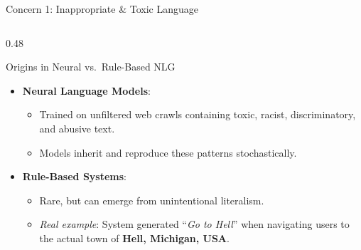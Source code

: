 \documentclass[aspectratio=169, 10pt]{beamer}
\begin{document}
\begin{frame}{Concern 1: Inappropriate \& Toxic Language}
  \begin{columns}[T]
    \begin{column}{0.48\textwidth}
      \begin{block}{Origins in Neural vs.\ Rule-Based NLG}
        \begin{itemize}
          \item \textbf{Neural Language Models}:
          \begin{itemize}
            \item Trained on unfiltered web crawls containing toxic, racist, discriminatory, and abusive text.
            \item Models inherit and reproduce these patterns stochastically.
          \end{itemize}
          \item \textbf{Rule-Based Systems}:
          \begin{itemize}
            \item Rare, but can emerge from unintentional literalism.
            \item \textit{Real example}: System generated ``\textit{Go to Hell}'' when navigating users to the actual town of \textbf{Hell, Michigan, USA}.
          \end{itemize}
        \end{itemize}
      \end{block}
    \end{column}


\end{columns}
\end{frame}
\end{document}
